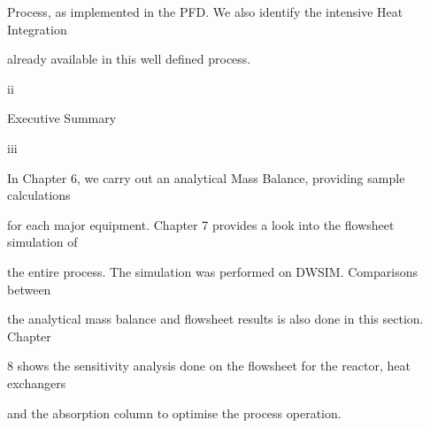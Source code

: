 \documentclass[a4paper,portrait,12pt]{article}
\begin{document}
\begin{flushleft}
Process, as implemented in the PFD. We also identify the intensive Heat Integration
\end{flushleft}


\begin{flushleft}
already available in this well defined process.
\end{flushleft}





\begin{flushleft}
ii
\end{flushleft}





\begin{flushleft}
\newpage
Executive Summary
\end{flushleft}





\begin{flushleft}
iii
\end{flushleft}





\begin{flushleft}
In Chapter 6, we carry out an analytical Mass Balance, providing sample calculations
\end{flushleft}


\begin{flushleft}
for each major equipment. Chapter 7 provides a look into the flowsheet simulation of
\end{flushleft}


\begin{flushleft}
the entire process. The simulation was performed on DWSIM. Comparisons between
\end{flushleft}


\begin{flushleft}
the analytical mass balance and flowsheet results is also done in this section. Chapter
\end{flushleft}


\begin{flushleft}
8 shows the sensitivity analysis done on the flowsheet for the reactor, heat exchangers
\end{flushleft}


\begin{flushleft}
and the absorption column to optimise the process operation.
\end{flushleft}
\end{document}
